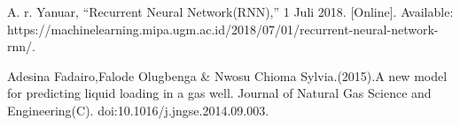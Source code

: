 \documentclass[sn-mathphys,Numbered]{sn-jnl}%
\theoremstyle{thmstyleone}%
\theoremstyle{thmstyletwo}%
\theoremstyle{thmstylethree}%
\begin{document}







A. r. Yanuar, “Recurrent Neural Network(RNN),” 1 Juli 2018. [Online]. Available: https://machinelearning.mipa.ugm.ac.id/2018/07/01/recurrent-neural-network-rnn/.

Adesina Fadairo,Falode Olugbenga \& Nwosu Chioma Sylvia.(2015).A new model for predicting liquid loading in a gas well. Journal of Natural Gas Science and Engineering(C). doi:10.1016/j.jngse.2014.09.003.
\end{document}
